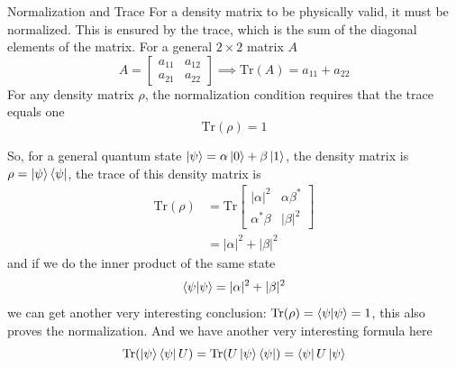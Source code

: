 \documentclass[11pt, letterpaper]{article}
\begin{document}
\begin{SBUBox}{Normalization and Trace}
  For a density matrix to be physically valid, it must be normalized. This is ensured by the trace, which is the sum of the diagonal elements of the matrix. For a general $2 \times 2$ matrix $A$
  \begin{equation*}
    A = \begin{bmatrix} a_{11} & a_{12} \\ a_{21} & a_{22} \end{bmatrix} \implies \text{Tr}(A) = a_{11} + a_{22}
  \end{equation*}
  For any density matrix $\rho$, the normalization condition requires that the trace equals one
  \begin{equation*}
    \text{Tr}(\rho) = 1
  \end{equation*}
\end{SBUBox}

So, for a general quantum state $\ket{\psi} = \alpha\ket{0}+\beta\ket{1}$, the density matrix is $\rho = \ket{\psi}\bra{\psi}$, the trace of this density matrix is
\begin{equation}
  \begin{aligned}
    \text{Tr}(\rho) &= \text{Tr}\begin{bmatrix}
      |\alpha|^2 & \alpha \beta^* \\
      \alpha^* \beta & |\beta|^2
    \end{bmatrix} \\
    & = |\alpha|^2 + |\beta|^2
  \end{aligned}
\end{equation}
and if we do the inner product of the same state
\begin{equation}
  \braket{\psi|\psi} = |\alpha|^2 + |\beta|^2
\end{equation}
we can get another very interesting conclusion: $\text{Tr}(\rho) = \braket{\psi|\psi} = 1$, this also proves the normalization. And we have another very interesting formula here 
\begin{equation}
  \text{Tr}(\ket{\psi}\bra{\psi}U) = \text{Tr}(U\ket{\psi}\bra{\psi}) = \bra{\psi}U\ket{\psi}
  \label{eq: tr_u}
\end{equation}
\end{document}
